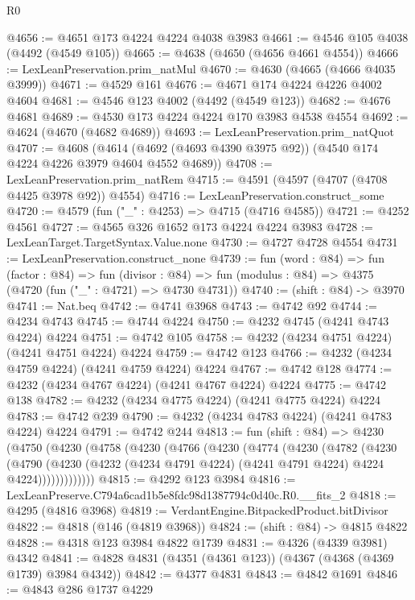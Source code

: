 \begin{lexlean}{R0}
\begin{coremodule}
@4656 := @4651 @173 @4224 @4224 @4038 @3983
@4661 := @4546 @105 @4038 (@4492 (@4549 @105))
@4665 := @4638 (@4650 (@4656 @4661 @4554))
@4666 := LexLeanPreservation.prim_natMul
@4670 := @4630 (@4665 (@4666 @4035 @3999))
@4671 := @4529 @161
@4676 := @4671 @174 @4224 @4226 @4002 @4604
@4681 := @4546 @123 @4002 (@4492 (@4549 @123))
@4682 := @4676 @4681
@4689 := @4530 @173 @4224 @4224 @170 @3983 @4538 @4554
@4692 := @4624 (@4670 (@4682 @4689))
@4693 := LexLeanPreservation.prim_natQuot
@4707 := @4608
    (@4614 (@4692 (@4693 @4390 @3975 @92)) (@4540 @174 @4224 @4226 @3979 @4604 @4552 @4689))
@4708 := LexLeanPreservation.prim_natRem
@4715 := @4591 (@4597 (@4707 (@4708 @4425 @3978 @92)) @4554)
@4716 := LexLeanPreservation.construct_some
@4720 := @4579 (fun ("_" : @4253) => @4715 (@4716 @4585))
@4721 := @4252 @4561
@4727 := @4565 @326 @1652 @173 @4224 @4224 @3983
@4728 := LexLeanTarget.TargetSyntax.Value.none
@4730 := @4727 @4728 @4554
@4731 := LexLeanPreservation.construct_none
@4739 := fun (word : @84) =>
  fun (factor : @84) =>
  fun (divisor : @84) => fun (modulus : @84) => @4375 (@4720 (fun ("_" : @4721) => @4730 @4731))
@4740 := (shift : @84) -> @3970
@4741 := Nat.beq
@4742 := @4741 @3968
@4743 := @4742 @92
@4744 := @4234 @4743
@4745 := @4744 @4224
@4750 := @4232 @4745 (@4241 @4743 @4224) @4224
@4751 := @4742 @105
@4758 := @4232 (@4234 @4751 @4224) (@4241 @4751 @4224) @4224
@4759 := @4742 @123
@4766 := @4232 (@4234 @4759 @4224) (@4241 @4759 @4224) @4224
@4767 := @4742 @128
@4774 := @4232 (@4234 @4767 @4224) (@4241 @4767 @4224) @4224
@4775 := @4742 @138
@4782 := @4232 (@4234 @4775 @4224) (@4241 @4775 @4224) @4224
@4783 := @4742 @239
@4790 := @4232 (@4234 @4783 @4224) (@4241 @4783 @4224) @4224
@4791 := @4742 @244
@4813 := fun (shift : @84) =>
  @4230
    (@4750
      (@4230
        (@4758
          (@4230
            (@4766
              (@4230
                (@4774
                  (@4230
                    (@4782
                      (@4230
                        (@4790
                          (@4230
                            (@4232 (@4234 @4791 @4224) (@4241 @4791 @4224) @4224 @4224)))))))))))))
@4815 := @4292 @123 @3984
@4816 := LexLeanPreserve.C794a6cad1b5e8fdc98d1387794c0d40c.R0.__fits_2
@4818 := @4295 (@4816 @3968)
@4819 := VerdantEngine.BitpackedProduct.bitDivisor
@4822 := @4818 (@146 (@4819 @3968))
@4824 := (shift : @84) -> @4815 @4822
@4828 := @4318 @123 @3984 @4822 @1739
@4831 := @4326 (@4339 @3981) @4342
@4841 := @4828 @4831 (@4351 (@4361 @123)) (@4367 (@4368 (@4369 @1739) @3984 @4342))
@4842 := @4377 @4831
@4843 := @4842 @1691
@4846 := @4843 @286 @1737 @4229

\end{coremodule}
\end{lexlean}
